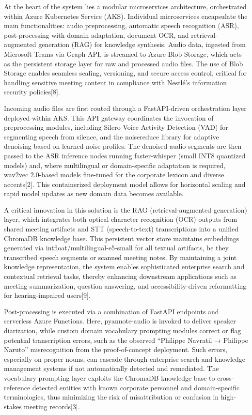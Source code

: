 \documentclass[12pt,a4paper]{article}
\begin{document}
At the heart of the system lies a modular microservices architecture, orchestrated within Azure Kubernetes Service (AKS). Individual microservices encapsulate the main functionalities: audio preprocessing, automatic speech recognition (ASR), post-processing with domain adaptation, document OCR, and retrieval-augmented generation (RAG) for knowledge synthesis. Audio data, ingested from Microsoft Teams via Graph API, is streamed to Azure Blob Storage, which acts as the persistent storage layer for raw and processed audio files. The use of Blob Storage enables seamless scaling, versioning, and secure access control, critical for handling sensitive meeting content in compliance with Nestlé’s information security policies[8].


Incoming audio files are first routed through a FastAPI-driven orchestration layer deployed within AKS. This API gateway coordinates the invocation of preprocessing modules, including Silero Voice Activity Detection (VAD) for segmenting speech from silence, and the noisereduce library for adaptive denoising based on learned noise profiles. The denoised audio segments are then passed to the ASR inference nodes running faster-whisper (small INT8 quantized models) and, where multilingual or domain-specific adaptation is required, wav2vec 2.0-based models fine-tuned for the corporate lexicon and diverse accents[2]. This containerized deployment model allows for horizontal scaling and rapid model updates as new domain data becomes available.


A critical innovation in this solution is the RAG (retrieval-augmented generation) layer, which integrates both optical character recognition (OCR) outputs from shared meeting artifacts and STT (speech-to-text) transcriptions into a unified ChromaDB knowledge base. This persistent vector store maintains embeddings generated via intfloat/multilingual-e5-small for all textual artifacts, be they transcribed speech segments or scanned meeting notes. By maintaining a joint knowledge representation, the system enables sophisticated enterprise search and contextual retrieval tasks, thereby enhancing downstream applications such as meeting summarization, question answering, and accessibility-driven reformatting for hearing-impaired users[9].


Post-processing is executed via a combination of FastAPI endpoints and serverless Azure Functions. Here, pyannote-audio is invoked to deliver speaker diarization, while custom domain vocabulary prompting modules correct or flag potential transcription errors, such as the observed “Philippe Navratil → Philippe Naruto” misrecognition from the proof-of-concept deployment. Such errors, especially on proper nouns, can cascade through enterprise search and knowledge management systems if not automatically detected and remediated. The vocabulary prompting layer exploits the ChromaDB knowledge base to cross-reference detected entities with known corporate personnel and domain-specific terminologies, thus minimizing the risk of misattribution or confusion in high-stakes meeting records[3].
\end{document}
